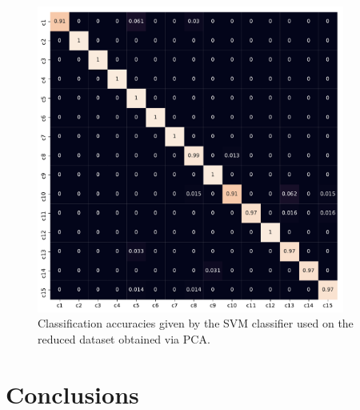 \begin{figure}[tb]
  \centering
  \includegraphics[width=0.9\textwidth]{Figures/VVBs/VVBs-svcAccuracies_15classes_halftrainingdata_40dims_linear.pdf}
  \caption{
      Classification accuracies given by the SVM classifier used on the reduced dataset obtained via PCA.
    }
    \label{fig:VVBs:SVC_accuracies}
\end{figure}


\section{Conclusions}
\label{sec:VVBs:conclusions}

